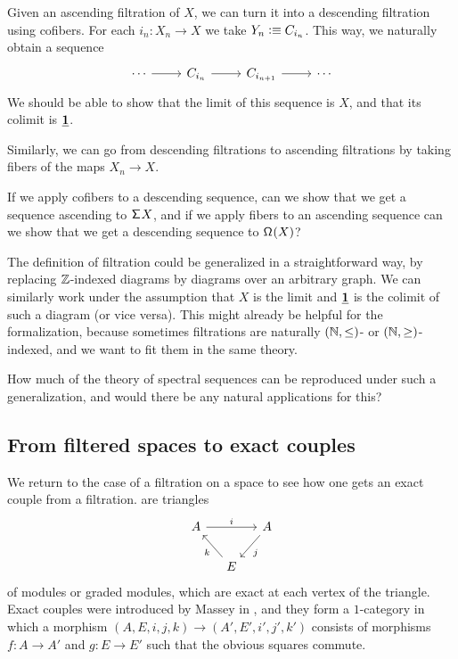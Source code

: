 \documentclass[reqno]{amsart}
\begin{document}
\begin{proposal}\label{p:filtrations}
Given an ascending filtration of $X$, we can turn it into a descending filtration
using cofibers. For each $i_n : X_n\to X$ we take $Y_n\vcentcolon\equiv C_{i_n}$. This way,
we naturally obtain a sequence
\begin{equation*}
\begin{tikzcd}
\cdots \arrow[r] & C_{i_n} \arrow[r] & C_{i_{n+1}} \arrow[r] & \cdots
\end{tikzcd}
\end{equation*}
We should be able to show that the limit of this sequence is $X$, and that its
colimit is $\underline{\mathbf{1}}$.

Similarly, we can go from descending filtrations to ascending filtrations by
taking fibers of the maps $X_n\to X$. 

If we apply cofibers to a descending sequence, can we show that we get a sequence ascending
to $\mathsf{\Sigma}^{}{X}$, and if we apply fibers to an ascending sequence can we show that we get
a descending sequence to $\mathsf{\Omega}^{}(X)$? 
\end{proposal}

\begin{proposal}\label{p:general_filtrations}
The definition of filtration could be generalized in a straightforward way,
by replacing $\mathbb{Z}$-indexed diagrams by diagrams over an arbitrary graph. We can
similarly work under the assumption that $X$ is the limit and $\underline{\mathbf{1}}$ is the
colimit of such a diagram (or vice versa). This might already be helpful for
the formalization, because sometimes filtrations are naturally $(\mathbb{N},\leq)$-
or $(\mathbb{N},\geq)$-indexed, and we want to fit them in the same theory.

How much of the theory of spectral sequences can be reproduced under such a 
generalization, and would there be any natural applications for this?
\end{proposal}

\subsection{From filtered spaces to exact couples}
We return to the case of a filtration on a space to see how one gets an exact
couple from a filtration.  are triangles
\begin{equation*}
\begin{tikzcd}[column sep=small]
A \arrow[rr,"i"] & & A \arrow[dl,"j"] \\
& E \arrow[ul,"k"]
\end{tikzcd}
\end{equation*}
of modules or graded modules, which are exact at each vertex of the triangle.
Exact couples were introduced by Massey in \cite{Massey52}, and they form
a $1$-category in which a morphism $(A,E,i,j,k)\to(A',E',i',j',k')$ consists
of morphisms $f:A\to A'$ and $g:E\to E'$ such that the obvious squares commute.
\end{document}
